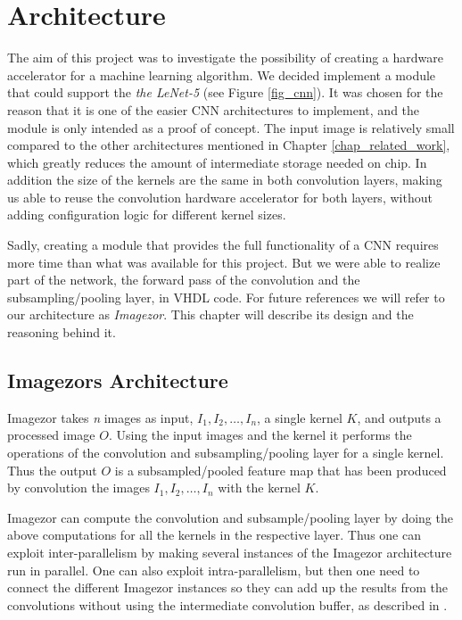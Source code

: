 \chapter{Architecture} \label{architecture}

The aim of this project was to investigate the possibility of creating a hardware accelerator for a machine learning algorithm. We decided implement a module that could support the \textit{the LeNet-5} \cite{LeCun1998} (see Figure \ref{fig_cnn}). It was chosen for the reason that it is one of the easier CNN architectures to implement, and the module is only intended as a proof of concept. The input image is relatively small compared to the other architectures mentioned in Chapter \ref{chap_related_work}, which greatly reduces the amount of intermediate storage needed on chip. In addition the size of the kernels are the same in both convolution layers, making us able to reuse the convolution hardware accelerator for both layers, without adding configuration logic for different kernel sizes. 

Sadly, creating a module that provides the full functionality of a CNN requires more time than what was available for this project. But we were able to realize part of the network, the forward pass of the convolution and the subsampling/pooling layer, in VHDL code. For future references we will refer to our architecture as \textit{Imagezor}. This chapter will describe its design and the reasoning behind it. 


\section{Imagezors Architecture}

Imagezor takes \textit{n} images as input, $ I_1, I_2, \dots, I_n $, a single kernel $ K $, and outputs a processed image $ O $. Using the input images and the kernel it performs the operations of the convolution and subsampling/pooling layer for a single kernel. Thus the output $ O $ is a subsampled/pooled feature map that has been produced by convolution the images $ I_1, I_2, \dots, I_n $ with the kernel $ K $. 

Imagezor can compute the convolution and subsample/pooling layer by doing the above computations for all the kernels in the respective layer. Thus one can exploit inter-parallelism by making several instances of the Imagezor architecture run in parallel. One can also exploit intra-parallelism, but then one need to connect the different Imagezor instances so they can add up the results from the convolutions without using the intermediate convolution buffer, as described in \cite{Chakradhar2010}.

